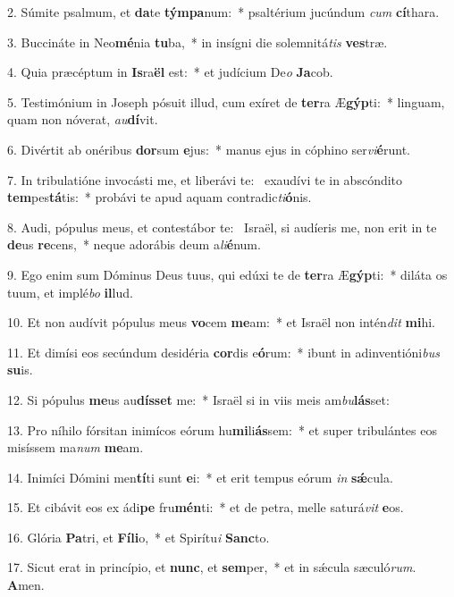 2. Súmite psalmum, et \textbf{da}te \textbf{tým}\textbf{pa}num:~*  psaltérium jucúndum \textit{cum} \textbf{cí}thara.\

3. Buccináte in Neo\textbf{mé}nia \textbf{tu}ba,~*  in insígni die solemnitá\textit{tis} \textbf{ves}træ.\

4. Quia præcéptum in \textbf{Is}ra\textbf{ël} est:~*  et judícium De\textit{o} \textbf{Ja}cob.\

5. Testimónium in Joseph pósuit illud, cum exíret de \textbf{ter}ra Æ\textbf{gýp}ti:~*  linguam, quam non nóverat, \textit{au}\textbf{dí}vit.\

6. Divértit ab onéribus \textbf{dor}sum \textbf{e}jus:~*  manus ejus in cóphino ser\textit{vi}\textbf{é}runt.\

7. In tribulatióne invocásti me, et liberávi te: \dag\  exaudívi te in abscóndito \textbf{tem}pes\textbf{tá}tis:~*  probávi te apud aquam contradic\textit{ti}\textbf{ó}nis.\

8. Audi, pópulus meus, et contestábor te: \dag\  Israël, si audíeris me, non erit in te \textbf{de}us \textbf{re}cens,~*  neque adorábis deum a\textit{li}\textbf{é}num.\

9. Ego enim sum Dóminus Deus tuus, qui edúxi te de \textbf{ter}ra Æ\textbf{gýp}ti:~*  diláta os tuum, et implé\textit{bo} \textbf{il}lud.\

10. Et non audívit pópulus meus \textbf{vo}cem \textbf{me}am:~*  et Israël non intén\textit{dit} \textbf{mi}hi.\

11. Et dimísi eos secúndum desidéria \textbf{cor}dis e\textbf{ó}rum:~*  ibunt in adinventióni\textit{bus} \textbf{su}is.\

12. Si pópulus \textbf{me}us au\textbf{dís}\textbf{set} me:~*  Israël si in viis meis am\textit{bu}\textbf{lás}set:\

13. Pro níhilo fórsitan inimícos eórum hu\textbf{mi}li\textbf{ás}sem:~*  et super tribulántes eos misíssem ma\textit{num} \textbf{me}am.\

14. Inimíci Dómini men\textbf{tí}ti sunt \textbf{e}i:~*  et erit tempus eórum \textit{in} \textbf{sǽ}cula.\

15. Et cibávit eos ex ádi\textbf{pe} fru\textbf{mén}ti:~*  et de petra, melle saturá\textit{vit} \textbf{e}os.\

16. Glória \textbf{Pa}tri, et \textbf{Fí}\textbf{li}o,~*  et Spirítu\textit{i} \textbf{Sanc}to.\

17. Sicut erat in princípio, et \textbf{nunc}, et \textbf{sem}per,~*  et in sǽcula sæculó\textit{rum}. \textbf{A}men.\

